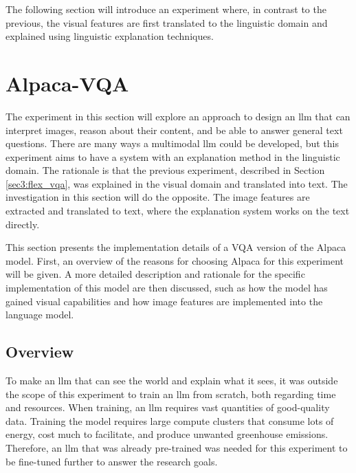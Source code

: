         The following section will introduce an experiment where, in contrast to the previous, the visual features are first translated to the linguistic domain and explained using linguistic explanation techniques.

    \section{Alpaca-VQA}
    \label{sec:3_alpaca_vqa}

    The experiment in this section will explore an approach to design an \gls{llm} that can interpret images, reason about their content, and be able to answer general text questions. 
    There are many ways a multimodal \gls{llm} could be developed, but this experiment aims to have a system with an explanation method in the linguistic domain. The rationale is that the previous experiment, described in Section \ref{sec3:flex_vqa}, was explained in the visual domain and translated into text. The investigation in this section will do the opposite. The image features are extracted and translated to text, where the explanation system works on the text directly. 

    This section presents the implementation details of a VQA version of the Alpaca model. First, an overview of the reasons for choosing Alpaca for this experiment will be given. A more detailed description and rationale for the specific implementation of this model are then discussed, such as how the model has gained visual capabilities and how image features are implemented into the language model.


        \subsection{Overview}
        To make an \gls{llm} that can see the world and explain what it sees, it was outside the scope of this experiment to train an \gls{llm} from scratch, both regarding time and resources. When training, an \gls{llm} requires vast quantities of good-quality data. Training the model requires large compute clusters that consume lots of energy, cost much to facilitate, and produce unwanted greenhouse emissions. Therefore, an \gls{llm} that was already pre-trained was needed for this experiment to be fine-tuned further to answer the research goals. 
        



